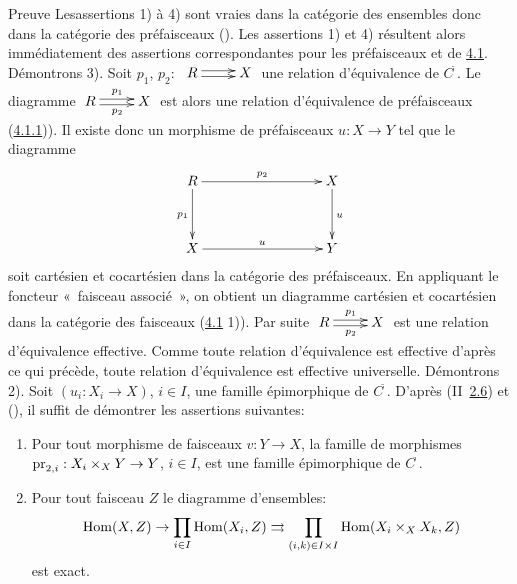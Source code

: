 \documentclass[10pt]{../fichiers-configuration-latex/smfart}
\begin{document}
\begin{enonce*}[remark]{Preuve}
Les\pageoriginale assertions 1) à 4) sont vraies dans la catégorie
des ensembles donc dans la catégorie des préfaisceaux
(). Les assertions 1) et 4) résultent alors
immédiatement des assertions correspondantes pour les préfaisceaux
et de \hyperref[II.theo4.1]{4.1}. Démontrons 3). Soit $p_1$, $p_2:$
$\xymatrix{R\ar@<2pt>[r] \ar@<-2pt>[r]& X}$ une relation
d'équivalence de $C^{\widetilde{\phantom{,}}}$. Le diagramme
$\xymatrix{R \ar@<2pt>[r]^{p_1} \ar@<-2pt>[r]_{p_2}&X}$ est alors
une relation d'équivalence de préfaisceaux (\hyperref[II.cor4.1.1]{4.1.1})). Il
existe donc un morphisme de préfaisceaux
       $u:X\rightarrow Y$ tel que le diagramme
\[
\xymatrix@C=3cm@R=1.25cm{
R \ar[r]^{p_2} \ar[d]_{p_1}& X\ar[d]^{u}\\
X \ar[r]^{u}& Y }
\]
soit cartésien et cocartésien dans la catégorie des
préfaisceaux. En appliquant le foncteur « faisceau associé », on obtient un diagramme cartésien et cocartésien dans la
catégorie des faisceaux (\hyperref[II.theo4.1]{4.1} 1)). Par suite
$\xymatrix{R \ar@<2pt>[r]^{p_1} \ar@<-2pt>[r]_{p_2}&X}$ est une
relation d'équivalence effective. Comme toute relation
d'équivalence est effective d'après ce qui précède, toute
relation d'équivalence est effective universelle. Démontrons 2).
Soit $(u_i:X_i\rightarrow X)$, $i\in I$, une famille épimorphique
de $C^{\widetilde{\phantom{,}}}$. D'après (II\ \hyperref[II.prop2.6]{2.6}) et
(), il suffit de démontrer les assertions
suivantes:
\begin{enumerate}
\renewcommand{\theenumi}{\alph{enumi}}
\renewcommand{\labelenumi}{\theenumi)}
\item Pour tout morphisme de faisceaux $v:Y\rightarrow X$, la famille
  de morphismes $\operatorname{pr}_{2,i}:X_i\times_X Y\rightarrow Y$, $i\in I$, est
  une famille épimorphique de $C^{\widetilde{\phantom{,}}}$.

\item Pour tout faisceau $Z$ le diagramme d'ensembles:
$$
\operatorname{Hom}(X,Z)\rightarrow \prod_{i\in I} \operatorname{Hom}(X_i,Z)\rightrightarrows
\prod_{(i,k)\in I\times I}\operatorname{Hom}(X_i\times_X X_k,Z)
$$
est exact.
\end{enumerate}
\end{enonce*}
\end{document}
